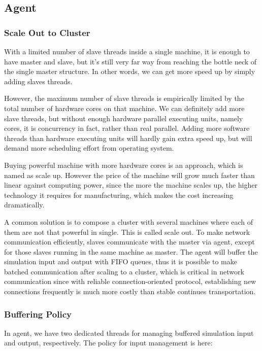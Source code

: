 \subsection{Agent}

\subsubsection{Scale Out to Cluster}

With a limited number of slave threads inside a single machine, it is enough to have master and slave, but it's still very far way from reaching the bottle neck of the single master structure. In other words, we can get more speed up by simply adding slaves threads.

However, the maximum number of slave threads is empirically limited by the total number of hardware cores on that machine. We can definitely add more slave threads, but without enough hardware parallel executing units, namely cores, it is concurrency in fact, rather than real parallel. Adding more software threads than hardware executing units will hardly gain extra speed up, but will demand more scheduling effort from operating system.

Buying powerful machine with more hardware cores is an approach, which is named as scale up. However the price of the machine will grow much faster than linear against computing power, since the more the machine scales up, the higher technology it requires for manufacturing, which makes the cost increasing dramatically.

A common solution is to compose a cluster with several machines where each of them are not that powerful in single. This is called scale out. To make network communication efficiently, slaves communicate with the master via agent, except for those slaves running in the same machine as master. The agent will buffer the simulation input and output with FIFO queues, thus it is possible to make batched communication after scaling to a cluster, which is critical in network communication since with reliable connection-oriented protocol, establishing new connections frequently is much more costly than stable continues transportation.

\subsubsection{Buffering Policy}

In agent, we have two dedicated threads for managing buffered simulation input and output, respectively. The policy for input management is here:

